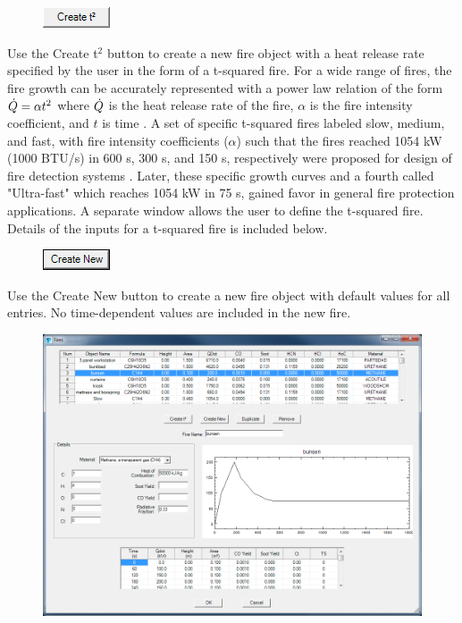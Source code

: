 \begin{figure}
  \includegraphics[width=0.781in]{FIGURES/Input_File/Create_t2_Button}
\end{figure}

Use the Create t$^2$ button to create a new fire object with a heat release rate specified by the user in the form of a t-squared fire.  For a wide range of fires, the fire growth can be accurately represented with a power law relation of the form $\dot{Q}=\alpha t^2$  where $\dot{Q}$  is the heat release rate of the fire, $\alpha$ is the fire intensity coefficient, and $t$ is time \cite{Schifiliti:2002}. A set of specific t-squared fires labeled slow, medium, and fast, with fire intensity coefficients ($\alpha$) such that the fires reached 1054 kW (1000 BTU/s) in 600 s, 300 s, and 150 s, respectively were proposed for design of fire detection systems .  Later, these specific growth curves and a fourth called "Ultra-fast" which reaches 1054 kW in 75 s, gained favor in general fire protection applications. A separate window allows the user to define the t-squared fire. Details of the inputs for a t-squared fire is included below.


\begin{figure}
  \includegraphics[width=0.781in]{FIGURES/Input_File/Create_New_Button}
\end{figure}

Use the Create New button to create a new fire object with default values for all entries.  No time-dependent values are included in the new fire.

\begin{figure}[h!]
\begin{center}
\includegraphics[width=6.5in]{FIGURES/Input_File/Fire_Object_Edit}
\end{center}
\end{figure}

